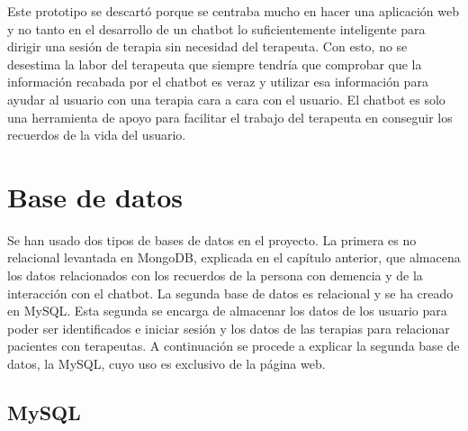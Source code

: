 Este prototipo se descartó porque se centraba mucho en hacer una aplicación web y no tanto en el desarrollo de un chatbot lo suficientemente inteligente para dirigir una sesión de terapia sin necesidad del terapeuta. Con esto, no se desestima la labor del terapeuta que siempre tendría que comprobar que la información recabada por el chatbot es veraz y utilizar esa información para ayudar al usuario con una terapia cara a cara con el usuario. El chatbot es solo una herramienta de apoyo para facilitar el trabajo del terapeuta en conseguir los recuerdos de la vida del usuario. 



\section{Base de datos}

Se han usado dos tipos de bases de datos en el proyecto. La primera es no relacional levantada en MongoDB, explicada en el capítulo anterior, que almacena los datos relacionados con los recuerdos de la persona con demencia y de la interacción con el chatbot. La segunda base de datos es relacional y se ha creado en MySQL. Esta segunda se encarga de almacenar los datos de los usuario para poder ser identificados e iniciar sesión y los datos de las terapias para relacionar pacientes con terapeutas. A continuación se procede a explicar la segunda base de datos, la MySQL, cuyo uso es exclusivo de la página web. 

\subsection{MySQL}


